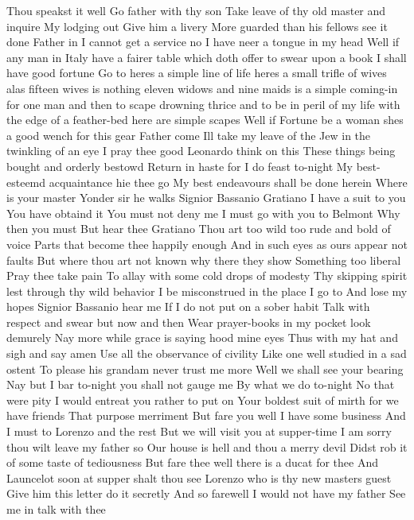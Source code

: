 Thou speakst it well Go father with thy son 
Take leave of thy old master and inquire 
My lodging out Give him a livery 
More guarded than his fellows see it done 
Father in I cannot get a service no I have 
neer a tongue in my head Well if any man in 
Italy have a fairer table which doth offer to swear 
upon a book I shall have good fortune Go to 
heres a simple line of life heres a small trifle 
of wives alas fifteen wives is nothing eleven 
widows and nine maids is a simple coming-in for one 
man and then to scape drowning thrice and to be 
in peril of my life with the edge of a feather-bed 
here are simple scapes Well if Fortune be a 
woman shes a good wench for this gear Father 
come Ill take my leave of the Jew in the twinkling of an eye 
I pray thee good Leonardo think on this 
These things being bought and orderly bestowd 
Return in haste for I do feast to-night 
My best-esteemd acquaintance hie thee go 
My best endeavours shall be done herein 
Where is your master 
Yonder sir he walks 
Signior Bassanio 
Gratiano 
I have a suit to you 
You have obtaind it 
You must not deny me I must go with you to Belmont 
Why then you must But hear thee Gratiano 
Thou art too wild too rude and bold of voice 
Parts that become thee happily enough 
And in such eyes as ours appear not faults 
But where thou art not known why there they show 
Something too liberal Pray thee take pain 
To allay with some cold drops of modesty 
Thy skipping spirit lest through thy wild behavior 
I be misconstrued in the place I go to 
And lose my hopes 
Signior Bassanio hear me 
If I do not put on a sober habit 
Talk with respect and swear but now and then 
Wear prayer-books in my pocket look demurely 
Nay more while grace is saying hood mine eyes 
Thus with my hat and sigh and say amen 
Use all the observance of civility 
Like one well studied in a sad ostent 
To please his grandam never trust me more 
Well we shall see your bearing 
Nay but I bar to-night you shall not gauge me 
By what we do to-night 
No that were pity 
I would entreat you rather to put on 
Your boldest suit of mirth for we have friends 
That purpose merriment But fare you well 
I have some business 
And I must to Lorenzo and the rest 
But we will visit you at supper-time 
I am sorry thou wilt leave my father so 
Our house is hell and thou a merry devil 
Didst rob it of some taste of tediousness 
But fare thee well there is a ducat for thee 
And Launcelot soon at supper shalt thou see 
Lorenzo who is thy new masters guest 
Give him this letter do it secretly 
And so farewell I would not have my father 
See me in talk with thee 
